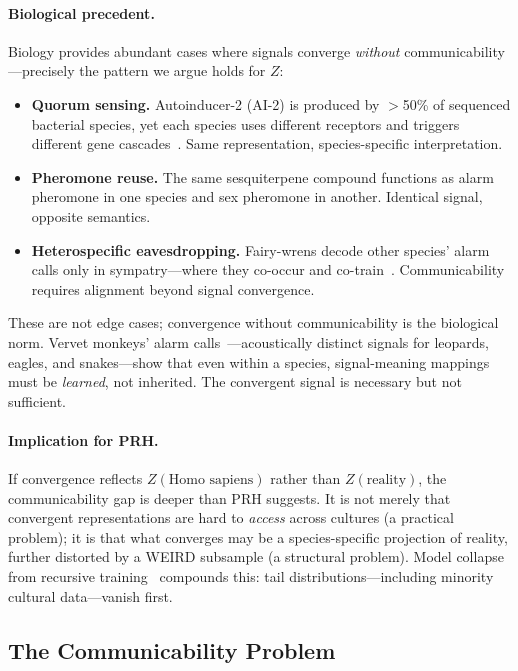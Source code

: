 \documentclass[11pt]{article}
\theoremstyle{definition}
\begin{document}
\paragraph{Biological precedent.}
Biology provides abundant cases where signals converge \emph{without} communicability---precisely the pattern we argue holds for $Z$:
\begin{itemize}[nosep]
  \item \textbf{Quorum sensing.} Autoinducer-2 (AI-2) is produced by $>$50\% of sequenced bacterial species, yet each species uses different receptors and triggers different gene cascades~\cite{waters2005quorum}. Same representation, species-specific interpretation.
  \item \textbf{Pheromone reuse.} The same sesquiterpene compound functions as alarm pheromone in one species and sex pheromone in another. Identical signal, opposite semantics.
  \item \textbf{Heterospecific eavesdropping.} Fairy-wrens decode other species' alarm calls only in sympatry---where they co-occur and co-train~\cite{magrath2015eavesdropping}. Communicability requires alignment beyond signal convergence.
\end{itemize}
These are not edge cases; convergence without communicability is the biological norm. Vervet monkeys' alarm calls~\cite{seyfarth1980vervet}---acoustically distinct signals for leopards, eagles, and snakes---show that even within a species, signal-meaning mappings must be \emph{learned}, not inherited. The convergent signal is necessary but not sufficient.

\paragraph{Implication for PRH.}
If convergence reflects $Z(\text{Homo sapiens})$ rather than $Z(\text{reality})$, the communicability gap is deeper than PRH suggests. It is not merely that convergent representations are hard to \emph{access} across cultures (a practical problem); it is that what converges may be a species-specific projection of reality, further distorted by a WEIRD subsample (a structural problem). Model collapse from recursive training~\cite{shumailov2024collapse} compounds this: tail distributions---including minority cultural data---vanish first.

\subsection{The Communicability Problem}\label{sec:communicability}
\end{document}
